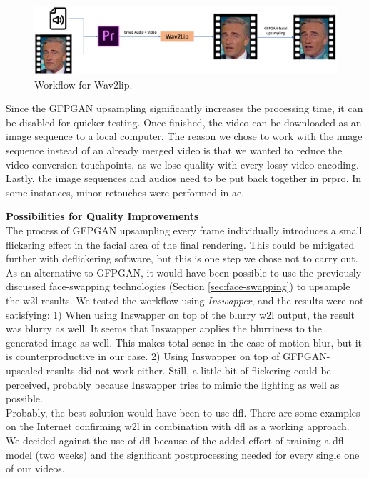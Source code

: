 \documentclass[
  a4paper,  %
  twoside,  %
  bibliography=totoc,
  headsepline,
  cleardoublepage=empty,
  parskip=half,
  draft=false
]{scrbook}
\begin{document}
\begin{figure}[h]
  \centering
  \includegraphics[width=1\textwidth]{./graphics/wav2lip/w2l workflow.png}
  \caption{Workflow for Wav2lip.}
  \label{fig:w2l workflow}
\end{figure}

Since the GFPGAN upsampling significantly increases the processing time, it can be disabled for quicker testing. Once finished, the video can be downloaded as an image sequence to a local computer. The reason we chose to work with the image sequence instead of an already merged video is that we wanted to reduce the video conversion touchpoints, as we lose quality with every lossy video encoding. Lastly, the image sequences and audios need to be put back together in \gls{prpro}. In some instances, minor retouches were performed in \gls{ae}.

\textbf{Possibilities for Quality Improvements} \\
The process of GFPGAN upsampling every frame individually introduces a small flickering effect in the facial area of the final rendering. This could be mitigated further with deflickering software, but this is one step we chose not to carry out. As an alternative to GFPGAN, it would have been possible to use the previously discussed face-swapping technologies (Section \ref{sec:face-swapping}) to upsample the \gls{w2l} results. We tested the workflow using \textit{Inswapper}, and the results were not satisfying: 1) When using Inswapper on top of the blurry \gls{w2l} output, the result was blurry as well. It seems that Inswapper applies the blurriness to the generated image as well. This makes total sense in the case of motion blur, but it is counterproductive in our case. 2) Using Inswapper on top of GFPGAN-upscaled results did not work either. Still, a little bit of flickering could be perceived, probably because Inswapper tries to mimic the lighting as well as possible. \\
Probably, the best solution would have been to use \gls{dfl}. There are some examples on the Internet confirming \gls{w2l} in combination with \gls{dfl} as a working approach. We decided against the use of \gls*{dfl} because of the added effort of training a \gls{dfl} model (two weeks) and the significant postprocessing needed for every single one of our videos. 
\end{document}
